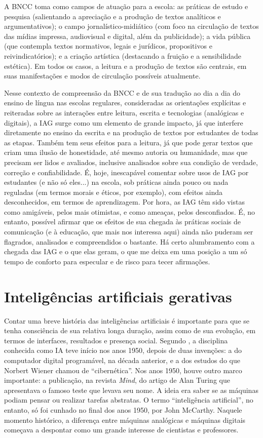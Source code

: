 \documentclass[portuguese]{textolivre}
\begin{document}
A BNCC toma como campos de atuação para a escola: as práticas de estudo e pesquisa (salientando a apreciação e a produção de textos analíticos e argumentativos); o campo jornalístico-midiático (com foco na circulação de textos das mídias impressa, audiovisual e digital, além da publicidade); a vida pública (que contempla textos normativos, legais e jurídicos, propositivos e reivindicatórios); e a criação artística (destacando a fruição e a sensibilidade estética). Em todos os casos, a leitura e a produção de textos são centrais, em suas manifestações e modos de circulação possíveis atualmente.

Nesse contexto de compreensão da BNCC e de sua tradução ao dia a dia do ensino de língua nas escolas regulares, consideradas as orientações explícitas e reiteradas sobre as interações entre leitura, escrita e tecnologias (analógicas e digitais), a IAG surge como um elemento de grande impacto, já que interfere diretamente no ensino da escrita e na produção de textos por estudantes de todas as etapas. Também tem seus efeitos para a leitura, já que pode gerar textos que criam uma ilusão de honestidade, até mesmo autoria ou humanidade, mas que precisam ser lidos e avaliados, inclusive analisados sobre sua condição de verdade, correção e confiabilidade. É, hoje, inescapável comentar sobre usos de IAG por estudantes (e não só eles...) na escola, sob práticas ainda pouco ou nada reguladas (em termos morais e éticos, por exemplo), com efeitos ainda desconhecidos, em termos de aprendizagem. Por hora, as IAG têm sido vistas como amigáveis, pelos mais otimistas, e como ameaças, pelos desconfiados. É, no entanto, possível afirmar que os efeitos de sua chegada às práticas sociais de comunicação (e à educação, que mais nos interessa aqui) ainda não puderam ser flagrados, analisados e compreendidos o bastante. Há certo alumbramento com a chegada das IAG e o que elas geram, o que me deixa em uma posição a um só tempo de conforto para especular e de risco para tecer afirmações.

\section{Inteligências artificiais gerativas}
Contar uma breve história das inteligências artificiais é importante para que se tenha consciência de sua relativa longa duração, assim como de sua evolução, em termos de interfaces, resultados e presença social. Segundo \textcite{coeckelbergh2023}, a disciplina conhecida como IA teve início nos anos 1950, depois de duas invenções: a do computador digital programável, na década anterior, e a dos estudos do que Norbert Wiener chamou de ``cibernética''. Nos anos 1950, houve outro marco importante: a publicação, na revista \textit{Mind}, do artigo de Alan Turing que apresentava o famoso teste que levava seu nome. A ideia era saber se as máquinas podiam pensar ou realizar tarefas abstratas. O termo ``inteligência artificial'', no entanto, só foi cunhado no final dos anos 1950, por John McCarthy. Naquele momento histórico, a diferença entre máquinas analógicas e máquinas digitais começava a despontar como um grande interesse de cientistas e professores.
\end{document}
